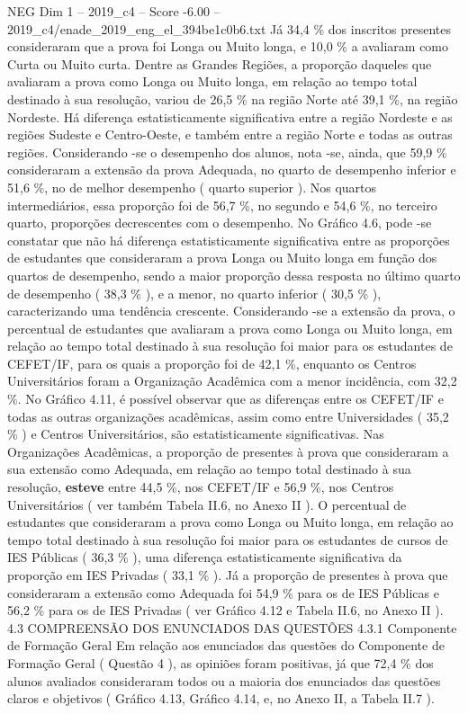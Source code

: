 \begin{textsample}{NEG Dim 1 – 2019\_c4 – Score -6.00 – 2019\_c4/enade\_2019\_eng\_el\_394be1c0b6.txt}
Já 34,4 \% dos inscritos presentes consideraram que a prova foi Longa ou Muito longa, e 10,0 \% a avaliaram como Curta ou Muito curta.
Dentre as Grandes Regiões, a proporção daqueles que avaliaram a prova como Longa ou Muito longa, em relação ao tempo total destinado à sua resolução, variou de 26,5 \% na região Norte até 39,1 \%, na região Nordeste.
Há diferença estatisticamente significativa entre a região Nordeste e as regiões Sudeste e Centro-Oeste, e também entre a região Norte e todas as outras regiões.
Considerando -se o desempenho dos alunos, nota -se, ainda, que 59,9 \% consideraram a extensão da prova Adequada, no quarto de desempenho inferior e 51,6 \%, no de melhor desempenho ( quarto superior ).
Nos quartos intermediários, essa proporção foi de 56,7 \%, no segundo e 54,6 \%, no terceiro quarto, proporções decrescentes com o desempenho.
No Gráfico 4.6, pode -se constatar que não há diferença estatisticamente significativa entre as proporções de estudantes que consideraram a prova Longa ou Muito longa em função dos quartos de desempenho, sendo a maior proporção dessa resposta no último quarto de desempenho ( 38,3 \% ), e a menor, no quarto inferior ( 30,5 \% ), caracterizando uma tendência crescente.
Considerando -se a extensão da prova, o percentual de estudantes que avaliaram a prova como Longa ou Muito longa, em relação ao tempo total destinado à sua resolução foi maior para os estudantes de CEFET/IF, para os quais a proporção foi de 42,1 \%, enquanto os Centros Universitários foram a Organização Acadêmica com a menor incidência, com 32,2 \%.
No Gráfico 4.11, é possível observar que as diferenças entre os CEFET/IF e todas as outras organizações acadêmicas, assim como entre Universidades ( 35,2 \% ) e Centros Universitários, são estatisticamente significativas.
Nas Organizações Acadêmicas, a proporção de presentes à prova que consideraram a sua extensão como Adequada, em relação ao tempo total destinado à sua resolução, \textbf{esteve} entre 44,5 \%, nos CEFET/IF e 56,9 \%, nos Centros Universitários ( ver também Tabela II.6, no Anexo II ).
O percentual de estudantes que consideraram a prova como Longa ou Muito longa, em relação ao tempo total destinado à sua resolução foi maior para os estudantes de cursos de IES Públicas ( 36,3 \% ), uma diferença estatisticamente significativa da proporção em IES Privadas ( 33,1 \% ).
Já a proporção de presentes à prova que consideraram a extensão como Adequada foi 54,9 \% para os de IES Públicas e 56,2 \% para os de IES Privadas ( ver Gráfico 4.12 e Tabela II.6, no Anexo II ). 4.3 COMPREENSÃO DOS ENUNCIADOS DAS QUESTÕES 4.3.1 Componente de Formação Geral Em relação aos enunciados das questões do Componente de Formação Geral ( Questão 4 ), as opiniões foram positivas, já que 72,4 \% dos alunos avaliados consideraram todos ou a maioria dos enunciados das questões claros e objetivos ( Gráfico 4.13, Gráfico 4.14, e, no Anexo II, a Tabela II.7 ).

\end{textsample}
